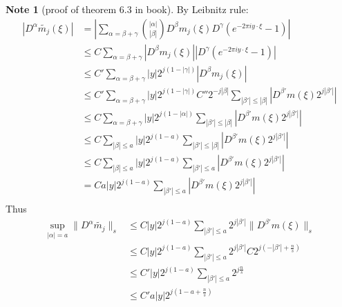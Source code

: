 \documentclass{report}
\theoremstyle{definition}
\newtheorem{note}{Note}
\theoremstyle{definition}
\theoremstyle{plain}
\numberwithin{theorem}{subsection}
\numberwithin{remark}{subsection}
\newcommand{\norm}[1]{\lVert#1\rVert}
\newcommand{\abs}[1]{\left\lvert#1\right\rvert}
\begin{document}
\begin{note}[proof of theorem 6.3 in book]\label{Leibnitz rule estimate for tilde m}
    By Leibnitz rule:
    \begin{align*}
        \abs{D^\alpha\tilde{m_j}(\xi)} & =\abs{\sum_{\alpha=\beta+\gamma}\binom{\abs{\alpha}}{\abs{\beta}} D^\beta m_j(\xi)D^\gamma(e^{-2\pi i y\cdot\xi}-1)}                                            \\
                                       & \leq C\sum_{\alpha=\beta+\gamma}\abs{D^\beta m_j(\xi)}\abs{D^\gamma(e^{-2\pi iy\cdot\xi}-1)}                                                                    \\
                                       & \leq C'\sum_{\alpha=\beta+\gamma}\abs{y}2^{j(1-\abs{\gamma})}\abs{D^\beta m_j(\xi)}                                                                             \\
                                       & \leq C'\sum_{\alpha=\beta+\gamma}\abs{y}2^{j(1-\abs{\gamma})}   C''2^{-j\abs{\beta}}\sum_{\abs{\beta'}\leq \abs{\beta}}\abs{D^{\beta'} m(\xi)2^{j\abs{\beta'}}} \\
                                       & \leq C\sum_{\alpha=\beta+\gamma}\abs{y}2^{j(1-\abs{\alpha})} \sum_{\abs{\beta'}\leq \abs{\beta}}\abs{D^{\beta'} m(\xi)2^{j\abs{\beta'}}}                        \\
                                       & \leq C\sum_{\abs{\beta}\leq a}\abs{y}2^{j(1-a)} \sum_{\abs{\beta'}\leq \abs{\beta}}\abs{D^{\beta'} m(\xi)2^{j\abs{\beta'}}}                                     \\
                                       & \leq C\sum_{\abs{\beta}\leq a}\abs{y}2^{j(1-a)} \sum_{\abs{\beta'}\leq {a}}\abs{D^{\beta'} m(\xi)2^{j\abs{\beta'}}}                                             \\
                                       & = Ca\abs{y}2^{j(1-a)} \sum_{\abs{\beta'}\leq {a}}\abs{D^{\beta'} m(\xi)2^{j\abs{\beta'}}}                                                                       \\
    \end{align*}
    Thus
    \begin{align*}
        \sup_{\abs{\alpha}=a}\norm{D^\alpha\tilde{m_j}}_s & \leq C\abs{y}2^{j(1-a)} \sum_{\abs{\beta'}\leq {a}}2^{j\abs{\beta'}}\norm{D^{\beta'} m(\xi)}_s        \\
                                                          & \leq C\abs{y}2^{j(1-a)} \sum_{\abs{\beta'}\leq {a}}2^{j\abs{\beta'}}C2^{j(-\abs{\beta'}+\frac{n}{s})} \\
                                                          & \leq C'\abs{y}2^{j(1-a)} \sum_{\abs{\beta'}\leq {a}}2^{j\frac{n}{s}}                                  \\
                                                          & \leq C' a\abs{y}2^{j(1-a+\frac{n}{s})}                                                                \\
    \end{align*}


\end{note}
\end{document}
